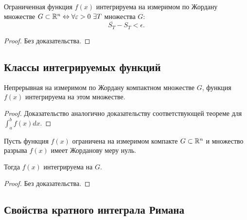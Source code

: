 \begin{theorem}
    Ограниченная функция $ f(x) $ интегрируема на измеримом по Жордану множестве $ G \subset \R^n \iff \forall \epsilon > 0 \ \exists T $ множества $ G $:
    \[
        \overline{S_T} - S_T < \epsilon.
    \]
\end{theorem}

\begin{proof}
    Без доказательства.
\end{proof}

\subsection{Классы интегрируемых функций}

\begin{theorem}
    Непрерывная на измеримом по Жордану компактном множестве $ G $, функция $ f(x) $ интегрируема на этом множестве.
\end{theorem}

\begin{proof}
    Доказательство аналогично доказательству соответствующей теореме для $ \int_{a}^{b}f(x)dx $.
\end{proof}

\begin{theorem}
    Пусть функция $ f(x) $ ограничена на измеримом компакте $ G \subset \mathbb{R}^n $ и множество разрыва $ f(x) $ имеет Жорданову меру нуль.

    Тогда $ f(x) $ интегрируема на $ G $.
\end{theorem}

\begin{proof}
    Без доказательства.
\end{proof}

\subsection{Свойства кратного интеграла Римана}

